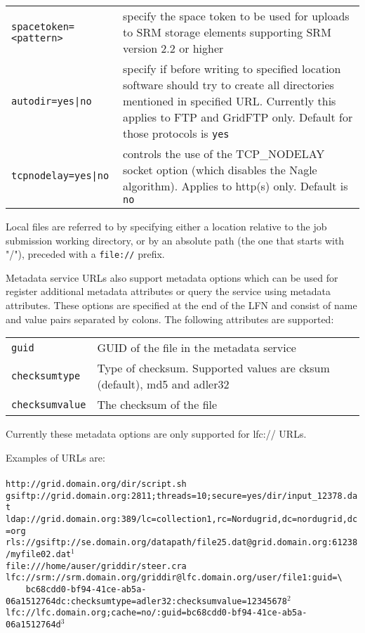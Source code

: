 \begin{longtable}{lp{10cm}}
   \verb#spacetoken=<pattern># & specify the space token to be used for
   uploads to SRM storage elements supporting SRM version 2.2 or higher\\
   \verb#autodir=yes|no# & specify if before writing to specified location
   software should try to create all directories mentioned in specified
   URL. Currently this applies to FTP and GridFTP only. Default for those
   protocols is \verb#yes#\\
   \verb#tcpnodelay=yes|no# & controls the use of the TCP\_NODELAY
   socket option (which disables the Nagle algorithm). Applies to
   http(s) only. Default is \verb#no#\\ 
\end{longtable}

Local files are referred to by specifying either a location relative
to the job submission working directory, or by an absolute path (the
one that starts with "/"), preceded with a \verb#file://# prefix.

Metadata service URLs also support metadata options which can be used
for register additional metadata attributes or query the service using
metadata attributes. These options are specified at the end of the LFN
and consist of name and value pairs separated by colons. The following
attributes are supported:

\begin{tabular}{lp{10cm}}
   \verb#guid# & GUID of the file in the metadata service \\
   \verb#checksumtype# & Type of checksum. Supported values are cksum
   (default), md5 and adler32 \\
   \verb#checksumvalue# & The checksum of the file \\
\end{tabular}

Currently these metadata options are only supported for lfc:// URLs.

\begin{framed}
   Examples of URLs are:\\
   \\
   \verb#http://grid.domain.org/dir/script.sh#\\
   \verb#gsiftp://grid.domain.org:2811;threads=10;secure=yes/dir/input_12378.dat#\\
   \verb#ldap://grid.domain.org:389/lc=collection1,rc=Nordugrid,dc=nordugrid,dc=org#\\
   \verb#rls://gsiftp://se.domain.org/datapath/file25.dat@grid.domain.org:61238/myfile02.dat#$^1$\\
   \verb#file:///home/auser/griddir/steer.cra#\\
   \verb#lfc://srm://srm.domain.org/griddir@lfc.domain.org/user/file1:guid=\# \\
   \verb#    bc68cdd0-bf94-41ce-ab5a-06a1512764dc:checksumtype=adler32:checksumvalue=12345678#$^2$\\
   \verb#lfc://lfc.domain.org;cache=no/:guid=bc68cdd0-bf94-41ce-ab5a-06a1512764d#$^3$\\
\end{framed}

